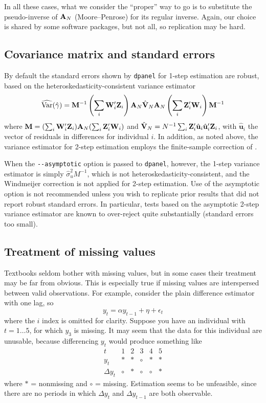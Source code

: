 In all these cases, what we consider the ``proper'' way to go is to
substitute the pseudo-inverse of $\mathbf{A}_N$ (Moore--Penrose) for its regular
inverse. Again, our choice is shared by some software packages, but
not all, so replication may be hard.

\subsection{Covariance matrix and standard errors}

By default the standard errors shown by \texttt{dpanel} for 1-step
estimation are robust, based on the heteroskedasticity-consistent
variance estimator
\[
  \widehat{\rm Var}(\hat{\gamma}) =
    \mathbf{M}^{-1} \left(\sum_i\mathbf{W}_i'\mathbf{Z}_i\right)
    \mathbf{A}_N\hat{\mathbf{V}}_N\mathbf{A}_N
    \left(\sum_i\mathbf{Z}_i'\mathbf{W}_i\right) \mathbf{M}^{-1}
  \]
  where $\mathbf{M} = (\sum_i\mathbf{W}_i'\mathbf{Z}_i) \mathbf{A}_N (\sum_i\mathbf{Z}_i'\mathbf{W}_i)$ and
  $\hat{\mathbf{V}}_N = N^{-1} \sum_i
  \mathbf{Z}_i'\hat{\mathbf{u}}_i\hat{\mathbf{u}}_i'\mathbf{Z}_i$, with
  $\hat{\mathbf{u}}_i$ the vector of residuals in differences for
  individual $i$.  In addition, as noted above, the variance estimator
  for 2-step estimation employs the finite-sample correction of
  \cite{Windmeijer05}.

  When the \verb|--asymptotic| option is passed to \texttt{dpanel},
  however, the 1-step variance estimator is simply
  $\hat{\sigma}_u^2 M^{-1}$, which is not
  heteroskedasticity-consistent, and the Windmeijer correction is not
  applied for 2-step estimation. Use of the asymptotic option is not
  recommended unless you wish to replicate prior results that did not
  report robust standard errors. In particular, tests based on the
  asymptotic 2-step variance estimator are known to over-reject quite
  substantially (standard errors too small).

\subsection{Treatment of missing values}

Textbooks seldom bother with missing values, but in some cases their
treatment may be far from obvious. This is especially true if missing
values are interspersed between valid observations. For example,
consider the plain difference estimator with one lag, so
\[
y_t = \alpha y_{t-1} + \eta + \epsilon_t
\]
where the $i$ index is omitted for clarity. Suppose you have an
individual with $t=1\ldots5$, for which $y_3$ is missing. It may seem
that the data for this individual are unusable, because
differencing $y_t$ would produce something like
\[
\begin{array}{c|ccccc}
  t & 1 & 2 & 3 & 4 & 5 \\
  \hline
  y_t & * & * & \circ & * & * \\
  \Delta y_t & \circ & * & \circ & \circ & *
\end{array}
\]
where $*$ = nonmissing and $\circ$ = missing. Estimation seems to be
unfeasible, since there are no periods in which $\Delta y_t$ and
$\Delta y_{t-1}$ are both observable.

